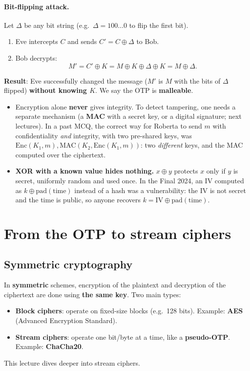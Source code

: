 \paragraph{Bit-flipping attack.} Let $\Delta$ be any bit string (e.g.\ $\Delta = 100\dots0$ to flip the first bit).
\begin{enumerate}
    \item Eve intercepts $C$ and sends $C' = C \oplus \Delta$ to Bob.
    \item Bob decrypts:
    \[
    M' = C' \oplus K = M \oplus K \oplus \Delta \oplus K = M \oplus \Delta.
    \]
\end{enumerate}
\textbf{Result}: Eve successfully changed the message ($M'$ is $M$ with the bits of $\Delta$ flipped) \textbf{without knowing $K$}. We say the OTP is \textbf{malleable}.

\begin{remark}
\begin{itemize}
    \item Encryption alone \textbf{never} gives integrity. To detect tampering, one needs a separate mechanism (a \textbf{MAC} with a secret key, or a digital signature; next lectures). In a past MCQ, the correct way for Roberta to send $m$ with confidentiality \emph{and} integrity, with two pre-shared keys, was $\mathrm{Enc}(K_1, m), \mathrm{MAC}(K_2, \mathrm{Enc}(K_1, m))$: two \emph{different} keys, and the MAC computed over the ciphertext.
    \item \textbf{XOR with a known value hides nothing.} $x \oplus y$ protects $x$ only if $y$ is secret, uniformly random and used once. In the Final 2024, an IV computed as $k \oplus \mathrm{pad}(\text{time})$ instead of a hash was a vulnerability: the IV is not secret and the time is public, so anyone recovers $k = \mathrm{IV} \oplus \mathrm{pad}(\text{time})$.
\end{itemize}
\end{remark}

\section{From the OTP to stream ciphers}

\subsection{Symmetric cryptography}

In \textbf{symmetric} schemes, encryption of the plaintext and decryption of the ciphertext are done using \textbf{the same key}. Two main types:
\begin{itemize}
    \item \textbf{Block ciphers}: operate on fixed-size blocks (e.g.\ 128 bits). Example: \textbf{AES} (Advanced Encryption Standard).
    \item \textbf{Stream ciphers}: operate one bit/byte at a time, like a \textbf{pseudo-OTP}. Example: \textbf{ChaCha20}.
\end{itemize}
This lecture dives deeper into stream ciphers.

